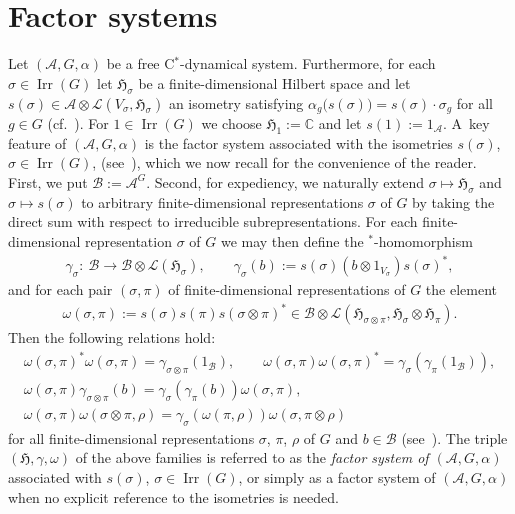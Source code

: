 \documentclass[10pt,a4paper]{amsart}
\numberwithin{equation}{section}
\newcommand*{\C}{\mathbb C}		%
\newcommand*{\tensor}{\otimes}		%
\newcommand*{\Star}{$^*$\nobreakdash}
\newcommand*{\hilb}{\mathfrak}		%
\newcommand*{\alg}{\mathcal}		%
\newcommand*{\hH}{\hilb{H}}			%
\newcommand*{\one}{1}				%
\newcommand*{\aA}{\alg{A}}			%
\newcommand*{\aB}{\alg{B}} 			%
\newcommand*{\End}{\mathcal{L}} %
\DeclareMathOperator{\Irrep}{Irr} 			%
\begin{document}
\section{Factor systems}\label{sec:facsys}

Let $(\aA,G,\alpha)$ be a free C\Star-dynamical system.
Furthermore, for each $\sigma \in \Irrep(G)$ let $\hH_\sigma$ be a finite-dimensional Hilbert space and let $s(\sigma) \in \aA \tensor \End(V_\sigma,\hH_\sigma)$ an isometry satisfying $\alpha_g\bigl(s(\sigma)\bigr)=s(\sigma) \cdot \sigma_g$ for all $g \in G$ (cf.~\cite[Lemma~3.3]{SchWa17c}).
For $1 \in \Irrep(G)$ we choose $\hH_1 := \C$ and let $s(1) := \one_\aA$.
A~key feature of $(\aA,G,\alpha)$ is the factor system associated with the isometries $s(\sigma)$, $\sigma \in \Irrep(G)$, (see~\cite[Definition~4.1]{SchWa17c}), which we now recall for the convenience of the reader.
First, we put $\aB := \aA^G$.
Second, for expediency, we naturally extend $\sigma \mapsto \hH_\sigma$ and $\sigma \mapsto s(\sigma)$ to arbitrary finite-dimensional representations $\sigma$ of $G$ by taking the direct sum with respect to irreducible subrepresentations.
For each finite-dimensional representation $\sigma$ of $G$ we may then define the \Star-homomorphism
\begin{gather*}
	\gamma_\sigma\colon \ \aB \to \aB \otimes \End(\hH_\sigma),
	\qquad
	\gamma_\sigma(b) := s(\sigma) (b \tensor \one_{V_\sigma}) s(\sigma)^*,
\end{gather*}
and for each pair $(\sigma,\pi)$ of finite-dimensional representations of $G$ the element
\begin{gather*}
	\omega(\sigma,\pi) := s(\sigma) s(\pi) s(\sigma \tensor \pi)^* \in \aB \tensor \End(\hH_{\sigma \tensor \pi},\hH_\sigma \tensor \hH_\pi).
\end{gather*}
Then the following relations hold:
\begin{gather}
	\label{eq:ranges_sys}
	\omega(\sigma,\pi)^* \omega(\sigma,\pi) = \gamma_{\sigma \tensor \pi}(\one_\aB),
	\qquad
	\omega(\sigma,\pi) \omega(\sigma,\pi)^* = \gamma_\sigma (\gamma_\pi(\one_\aB) ),
	\\
	\label{eq:coaction_sys}
	\omega(\sigma, \pi) \gamma_{\sigma \tensor \pi}(b) = \gamma_\sigma( \gamma_\pi(b) ) \omega(\sigma, \pi),
	\\
	\label{eq:cocycle_sys}
	\omega(\sigma, \pi) \omega(\sigma \tensor \pi, \rho)
		= \gamma_\sigma ( \omega(\pi, \rho) ) \omega(\sigma, \pi \tensor \rho)
\end{gather}
for all finite-dimensional representations $\sigma$, $\pi$, $\rho$ of $G$ and $b \in \aB$ (see~\cite[Lemma~4.3]{SchWa20}).
The triple $(\hH, \gamma, \omega)$ of the above families is referred to as the \emph{factor system of $(\aA, G, \alpha)$} associated with $s(\sigma)$, $\sigma \in \Irrep(G)$, or simply as a factor system of $(\aA, G, \alpha)$ when no explicit reference to the isometries is needed.
\end{document}
